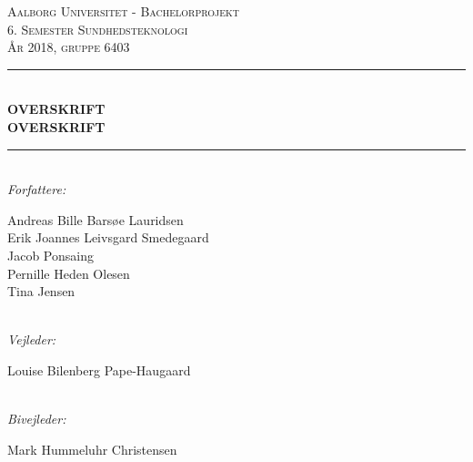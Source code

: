 \thispagestyle{empty}
\newcommand{\HRule}{\rule{\linewidth}{0.5mm}} %

\begin{center} %

\textsc{\LARGE Aalborg Universitet - Bachelorprojekt}\\[0.6cm] %
\textsc{\Large 6. Semester Sundhedsteknologi}\\[0.5cm] %
\textsc{\Large År 2018, gruppe 6403 }\\[0.5cm] %


\HRule \\[0.4cm]
{ \huge \bfseries OVERSKRIFT }\\[0.2cm] %
{ \huge \bfseries OVERSKRIFT}
\HRule \\[0.4cm]

\emph{Forfattere:}\\
{\large Andreas Bille Barsøe Lauridsen  \\ Erik Joannes Leivsgard Smedegaard \\ Jacob Ponsaing \\ Pernille Heden Olesen \\ Tina Jensen \par}\\[1.0cm] %

\emph{Vejleder:}\\
{\large Louise Bilenberg Pape-Haugaard \par}\\[1.0cm] %

\emph{Bivejleder:}\\
{\large Mark Hummeluhr Christensen \par}\\[1.0cm] 


\end{center}
